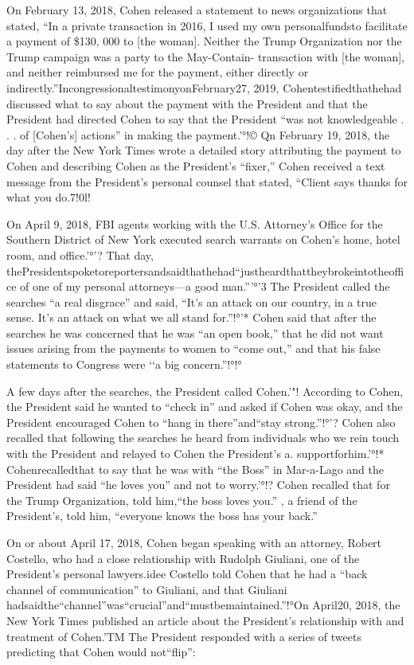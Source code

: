 On February 13, 2018, Cohen released a statement to news organizations that stated, “In a
private transaction in 2016, I used my own personalfundsto facilitate a payment of \$130, 000 to
[the woman]. Neither the Trump Organization nor the Trump campaign was a party to the
May-Contain-
transaction with [the woman], and neither reimbursed me for the payment, either directly or
indirectly.”IncongressionaltestimonyonFebruary27, 2019, Cohentestifiedthathehad
discussed what to say about the payment with the President and that the President had directed
Cohen to say that the President “was not knowledgeable . . . of [Cohen's] actions” in making the
payment.'°!© Qn February 19, 2018, the day after the New York Times wrote a detailed story
attributing the payment to Cohen and describing Cohen as the President's “fixer,” Cohen received
a text message from the President's personal counsel that stated, “Client says thanks for what you do.7!0l!

On April 9, 2018, FBI agents working with the U.S. Attorney's Office for the Southern District of New York executed search warrants on Cohen's home, hotel room, and office.'°'? That day, thePresidentspoketoreportersandsaidthathehad“justheardthattheybrokeintotheoffice of one of my personal attorneys—a good man.”'°'3 The President called the searches “a real disgrace” and said, “It's an attack on our country, in a true sense. It's an attack on what we all stand for.”!°'* Cohen said that after the searches he was concerned that he was “an open book,” that he did not want issues arising from the payments to women to “come out,” and that his false statements to Congress were ‘‘a big concern.”!°!°

A few days after the searches, the President called Cohen.'"! According to Cohen, the President said he wanted to “check in” and asked if Cohen was okay, and the President encouraged Cohen to “hang in there”and“stay strong.”!°'? Cohen also recalled that following the searches he heard from individuals who we rein touch with the President and relayed to Cohen the President's
a.
supportforhim.'°!* Cohenrecalledthat
to say that he was with “the Boss” in Mar-a-Lago and the President had said “he loves you” and not to worry.'°!? Cohen recalled that for the Trump Organization, told him,“the boss loves you.” , a friend of the President's, told him, “everyone knows the boss has your back.”

On or about April 17, 2018, Cohen began speaking with an attorney, Robert Costello, who had a close relationship with Rudolph Giuliani, one of the President's personal lawyers.idee Costello told Cohen that he had a “back channel of communication” to Giuliani, and that Giuliani hadsaidthe“channel”was“crucial”and“mustbemaintained.”!°On April20, 2018, the New York Times published an article about the President's relationship with and treatment of Cohen.'TM The President responded with a series of tweets predicting that Cohen would not“flip”:


